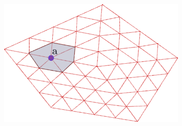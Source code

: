 \begin{frame}
\begin{overprint}
\begin{minipage}[c]{0.4 \linewidth}
\end{minipage}
\hfill
\begin{minipage}[c]{0.5 \linewidth}
\begin{figure}
    \includegraphics[width=0.84\textwidth]{patch_alg_5.pdf}
\end{figure}
\end{minipage}



\end{overprint}
\end{frame}
